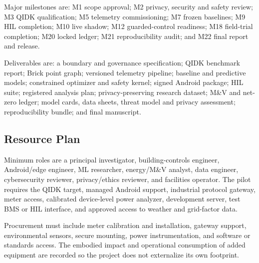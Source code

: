 Major milestones are: M1 scope approval; M2 privacy, security and safety review; M3 QIDK qualification; M5 telemetry commissioning; M7 frozen baselines; M9 HIL completion; M10 live shadow; M12 guarded-control readiness; M18 field-trial completion; M20 locked ledger; M21 reproducibility audit; and M22 final report and release.

Deliverables are: a boundary and governance specification; QIDK benchmark report; Brick point graph; versioned telemetry pipeline; baseline and predictive models; constrained optimizer and safety kernel; signed Android package; HIL suite; registered analysis plan; privacy-preserving research dataset; M\&V and net-zero ledger; model cards, data sheets, threat model and privacy assessment; reproducibility bundle; and final manuscript.

\subsection{Resource Plan}

Minimum roles are a principal investigator, building-controls engineer, Android/edge engineer, ML researcher, energy/M\&V analyst, data engineer, cybersecurity reviewer, privacy/ethics reviewer, and facilities operator. The pilot requires the QIDK target, managed Android support, industrial protocol gateway, meter access, calibrated device-level power analyzer, development server, test BMS or HIL interface, and approved access to weather and grid-factor data.

Procurement must include meter calibration and installation, gateway support, environmental sensors, secure mounting, power instrumentation, and software or standards access. The embodied impact and operational consumption of added equipment are recorded so the project does not externalize its own footprint.
